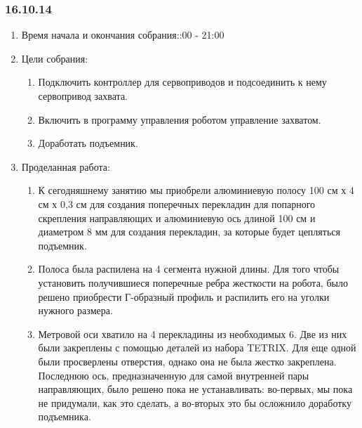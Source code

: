 
\subsubsection{16.10.14}

\begin{enumerate}
	\item Время начала и окончания собрания::00 - 21:00
	\item Цели собрания:\newline
	\begin{enumerate}
	  \item Подключить контроллер для сервоприводов и подсоединить к нему сервопривод захвата.\newline
	  
	  \item Включить в программу управления роботом управление захватом.\newline
	  
	  \item Доработать подъемник.\newline
	  
    \end{enumerate}
	\item Проделанная работа:\newline
	\begin{enumerate}
	  \item К сегодняшнему занятию мы приобрели алюминиевую полосу 100 см х 4 см х 0,3 см для создания поперечных перекладин для попарного скрепления направляющих и алюминиевую ось длиной 100 см и диаметром 8 мм для создания перекладин, за которые будет цепляться подъемник.\newline
      
      \item  Полоса была распилена на 4 сегмента нужной длины. Для того чтобы установить получившиеся поперечные ребра жесткости на робота, было решено приобрести Г-образный профиль и распилить его на уголки нужного размера.\newline
      
      \item  Метровой оси хватило на 4 перекладины из необходимых 6. Две из них были закреплены с помощью деталей из набора TETRIX. Для еще одной были просверлены отверстия, однако она не была жестко закреплена. Последнюю ось, предназначенную для самой внутренней пары направляющих, было решено пока не устанавливать: во-первых, мы пока не придумали, как это сделать, а во-вторых это бы осложнило доработку подъемника.\newline
      

\end{enumerate}
\end{enumerate}
